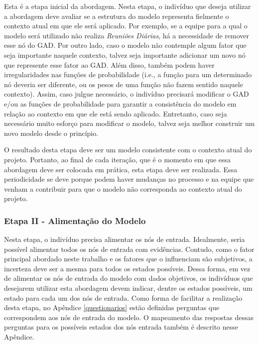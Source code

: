 Esta é a etapa inicial da abordagem. Nesta etapa, o indivíduo que deseja utilizar a abordagem deve avaliar se a estrutura do modelo representa fielmente o contexto atual em que ele será aplicado. Por exemplo, se a equipe para a qual o modelo será utilizado não realiza \textit{Reuniões Diárias}, há a necessidade de remover esse nó do GAD. Por outro lado, caso o modelo não contemple algum fator que seja importante naquele contexto, talvez seja importante adicionar um novo nó que represente esse fator ao GAD. Além disso, também podem haver irregularidades nas funções de probabilidade (i.e., a função para um determinado nó deveria ser diferente, ou os pesos de uma função não fazem sentido naquele contexto). Assim, caso julgue necessário, o indivíduo precisará modificar o GAD e/ou as funções de probabilidade para garantir a consistência do modelo em relação ao contexto em que ele está sendo aplicado. Entretanto, caso seja necessário muito esforço para modificar o modelo, talvez seja melhor construir um novo modelo desde o princípio.

O resultado desta etapa deve ser um modelo consistente com o contexto atual do projeto. Portanto, ao final de cada iteração, que é o momento em que essa abordagem deve ser colocada em prática, esta etapa deve ser realizada. Essa periodicidade se deve porque podem haver mudanças no processo e na equipe que venham a contribuir para que o modelo não corresponda ao contexto atual do projeto.

\subsubsection{Etapa II - Alimentação do Modelo}
\label{descricao:alimentacao}

Nesta etapa, o indivíduo precisa alimentar os nós de entrada. Idealmente, seria possível alimentar todos os nós de entrada com evidências. Contudo, como o fator principal abordado neste trabalho e os fatores que o influenciam são subjetivos, a incerteza deve ser a mesma para todos os estados possíveis. Dessa forma, em vez de alimentar os nós de entrada do modelo com dados objetivos, os indivíduos que desejarem utilizar esta abordagem devem indicar, dentre os estados possíveis, um estado para cada um dos nós de entrada. Como forma de facilitar a realização desta etapa, no Apêndice \ref{questionarios} estão definidas perguntas que correspondem aos nós de entrada do modelo. O mapeamento das respostas dessas perguntas para os possíveis estados dos nós entrada também é descrito nesse Apêndice.

